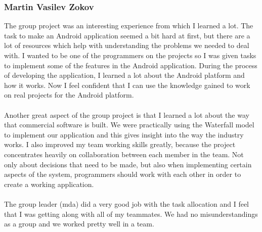 \documentclass[12pt]{article}
\begin{document}
\subsubsection{Martin Vasilev Zokov}
The group project was an interesting experience from which I learned a lot. The task to make an Android application seemed a bit hard at first, but there are a lot of resources which help with understanding the problems we needed to deal with. I wanted to be one of the programmers on the projects so I was given tasks to implement some of the features in the Android application. During the process of developing the application, I learned a lot about the Android platform and how it works. Now I feel confident that I can use the knowledge gained to work on real projects for the Android platform.
~\\\\ 
Another great aspect of the group project is that I learned a lot about the way that commercial software is built. We were practically using the Waterfall model to implement our application and this gives insight into the way the industry works. I also improved my team working skills greatly, because the project concentrates heavily on collaboration between each member in the team. Not only about decisions that need to be made, but also when implementing certain aspects of the system, programmers should work with each other in order to create a working application.
~\\\\ 
The group leader (mda) did a very good job with the task allocation and I feel that I was getting along with all of my teammates. We had no misunderstandings as a group and we worked pretty well in a team.
\end{document}
